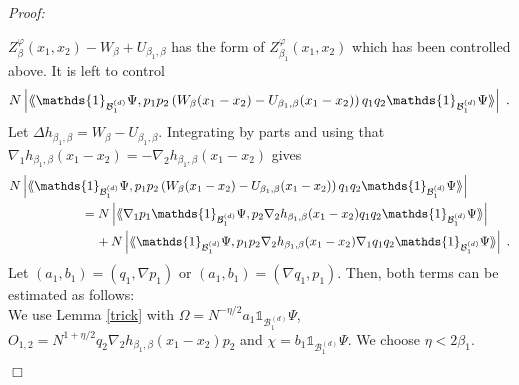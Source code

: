 \documentclass[11pt, english, american]{article}
\newcommand{\laa}{\langle\hspace{-0.08cm}\langle}
\newcommand{\raa}{\rangle\hspace{-0.08cm}\rangle}
\newenvironment{proof}{\emph{Proof:}}{\begin{flushright} $ \Box $ \end{flushright}}
\renewcommand{\phi}{\varphi}
\newcommand{\potdiff}{Z}
\begin{document}
\begin{proof}
\begin{enumerate}
 $\potdiff^\phi_\beta(x_1,x_2)-W_{\beta}+U_{\beta_1,\beta}$ has the form of $\potdiff^\phi_{\beta_1}(x_1,x_2)$ which has been controlled above. It is left to control $$
 N\left|\laa \mathds{1}_{{\mathcal{B}_1^{(d)}}} \Psi, p_1p_2\left(W_{\beta}(x_1-x_2)-U_{\beta_1,\beta}(x_1-x_2)\right)q_1q_2 \mathds{1}_{{\mathcal{B}_1^{(d)}}} \Psi\raa\right|\;.
 $$
Let  $\Delta h_{\beta_1,\beta}=W_{\beta}-U_{\beta_1,\beta}$. Integrating by parts and using that\\ $\nabla_1 h_{\beta_1,\beta}(x_1-x_2)=-\nabla_2 h_{\beta_1,\beta}(x_1-x_2)$ gives
 \begin{align}
\nonumber
&N\left|\laa \mathds{1}_{{\mathcal{B}_1^{(d)}}} \Psi, p_1p_2\left(W_{\beta}(x_1-x_2)-U_{\beta_1,\beta}(x_1-x_2)\right)q_1q_2  \mathds{1}_{{\mathcal{B}_1^{(d)}}} \Psi\raa\right|
%
\\\label{split1}&\hspace{2cm}=N\left|\laa\nabla_1p_1 \mathds{1}_{{\mathcal{B}_1^{(d)}}} \Psi, p_2\nabla_2 h_{\beta_1,\beta}(x_1-x_2)q_1q_2 \mathds{1}_{{\mathcal{B}_1^{(d)}}} \Psi\raa\right|
%
\\\label{split2}
&\hspace{2.4cm}+N\left|\laa \mathds{1}_{{\mathcal{B}_1^{(d)}}} \Psi, p_1p_2\nabla_2 h_{\beta_1,\beta}(x_1-x_2)\nabla_1q_1q_2 \mathds{1}_{{\mathcal{B}_1^{(d)}}} \Psi\raa\right|
\;.
\end{align}
Let $ (a_1,b_1)=(q_1,\nabla p_1)$ or $ (a_1,b_1)=( \nabla q_1,p_1)$. Then, both terms can be estimated as follows:
\\
We use Lemma \ref{trick} with $\Omega=N^{-\eta/2} a_1\mathds{1}_{{\mathcal{B}_1^{(d)}}} \Psi$,
 $O_{1,2}=N^{1+\eta/2}q_2\nabla_2 h_{\beta_1,\beta}(x_1-x_2)p_2$ and $\chi= b_1 \mathds{1}_{{\mathcal{B}_1^{(d)}}} \Psi$. We choose $ \eta < 2 \beta_1$.


\end{enumerate}
\end{proof}
\end{document}
